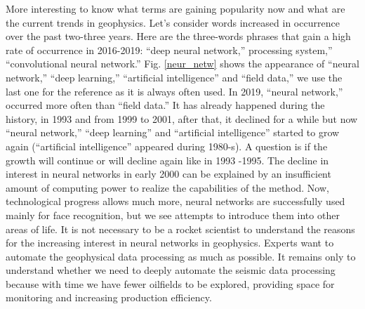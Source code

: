 \documentclass[geosciences,article,submit,moreauthors,pdftex]{Definitions/mdpi}
\begin{document}
More interesting to know what terms are gaining popularity now and what are the current trends in geophysics. Let's consider words increased in occurrence over the past two-three years. Here are the three-words phrases that gain a high rate of occurrence in 2016-2019: “deep neural network,”  processing system,” “convolutional neural network.” Fig. \ref{neur_netw} shows the appearance of “neural network,” “deep learning,” “artificial intelligence” and “field data,”  we use the last one for the reference as it is always often used. In 2019, “neural network,” occurred more often than “field data.” It has already happened during the history, in 1993 and from 1999 to 2001, after that, it declined for a while but now “neural network,” “deep learning” and “artificial intelligence” started to grow again (“artificial intelligence” appeared during 1980-s). A question is if the growth will continue or will decline again like in 1993 -1995. The decline in interest in neural networks in early 2000 can be explained by an insufficient amount of computing power to realize the capabilities of the method. Now, technological progress allows much more, neural networks are successfully used mainly for face recognition, but we see attempts to introduce them into other areas of life. It is not necessary to be a rocket scientist to understand the reasons for the increasing interest in neural networks in geophysics. Experts want to automate the geophysical data processing as much as possible. It remains only to understand whether we need to deeply automate the seismic data processing because with time we have fewer oilfields to be explored, providing space for monitoring and increasing production efficiency.
 
\end{document}
